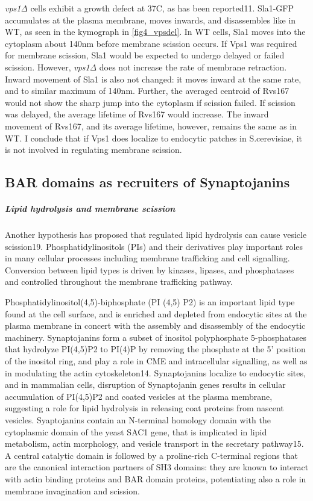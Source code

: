 	
	\vspace{5mm}
	\textit{vps1Δ }cells exhibit a growth defect at 37C, as has been reported11. Sla1-GFP accumulates at the plasma membrane, moves inwards, and disassembles like in WT, as seen in the kymograph in \ref{fig4_vpsdel}. In WT cells, Sla1 moves into the cytoplasm about 140nm before membrane scission occurs. If Vps1 was required for membrane scission, Sla1 would be expected to undergo delayed or failed scission. However, \textit{vps1Δ} does not increase the rate of membrane retraction. Inward movement of Sla1 is also not changed: it moves inward at the same rate, and to similar maximum of 140nm. Further, the averaged centroid of Rvs167 would not show the sharp jump into the cytoplasm if scission failed. If scission was delayed, the average lifetime of Rvs167 would increase. The inward movement of Rvs167, and its average lifetime, however, remains the same as in WT. I conclude that if Vps1 does localize to endocytic patches in S.cerevisiae, it is not involved in regulating membrane scission.  


	\subsection{BAR domains as recruiters of Synaptojanins} 
	\subparagraph{ Lipid hydrolysis and membrane scission}
	
	
	Another hypothesis has proposed that regulated lipid hydrolysis can cause vesicle scission19. Phosphatidylinositols (PIs) and their derivatives play important roles in many cellular processes including membrane trafficking and cell signalling. Conversion between lipid types is driven by kinases, lipases, and phosphatases and controlled throughout the membrane trafficking pathway. 

	\vspace{5mm}
	Phosphatidylinositol(4,5)-biphosphate (PI (4,5) P2) is an important lipid type found at the cell surface, and is enriched and depleted from endocytic sites at the plasma membrane in concert with the assembly and disassembly of the endocytic machinery. Synaptojanins form a subset of inositol polyphosphate 5-phosphatases that hydrolyze PI(4,5)P2 to PI(4)P by removing the phosphate at the 5’ position of the inositol ring, and play a role in CME and intracellular signalling, as well as in modulating the actin cytoskeleton14. Synaptojanins localize to endocytic sites, and in mammalian cells, disruption of Synaptojanin genes results in cellular accumulation of PI(4,5)P2 and coated vesicles at the plasma membrane, suggesting a role for lipid hydrolysis in releasing coat proteins from nascent vesicles. Syaptojanins contain an N-terminal homology domain with the cytoplasmic domain of the yeast SAC1 gene, that is implicated in lipid metabolism, actin morphology, and vesicle transport in the secretary pathway15. A central catalytic domain is followed by a proline-rich C-terminal regions that are the canonical interaction partners of SH3 domains: they are known to interact with actin binding proteins and BAR domain proteins, potentiating also a role in membrane invagination and scission. 
		
